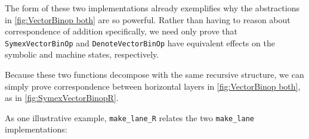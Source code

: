 \vspace{-1em}


The form of these two implementations already exemplifies why the abstractions in \autoref{fig:VectorBinop both} are so powerful. Rather than having to reason about correspondence of addition specifically, we need only prove that \texttt{SymexVectorBinOp} and \texttt{DenoteVectorBinOp} have equivalent effects on the symbolic and machine states, respectively. 

Because these two functions decompose with the same recursive structure, we can simply prove correspondence between horizontal layers in \autoref{fig:VectorBinop both}, as  in \autoref{fig:SymexVectorBinopR}.


As one illustrative example, \texttt{make_lane_R} relates the two \texttt{make_lane} implementations:


